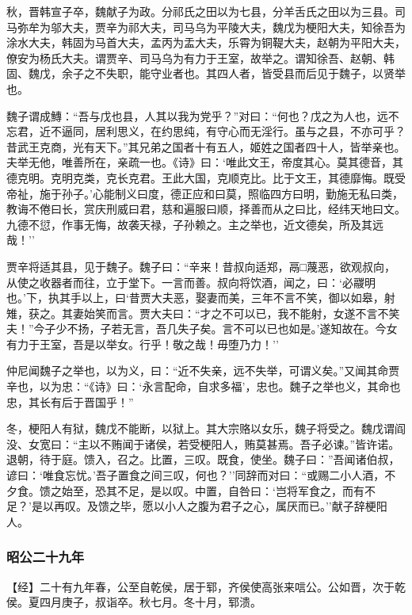 \documentclass[]{article}
\begin{document}
秋，晋韩宣子卒，魏献子为政。分祁氏之田以为七县，分羊舌氏之田以为三县。司马弥牟为邬大夫，贾辛为祁大夫，司马乌为平陵大夫，魏戊为梗阳大夫，知徐吾为涂水大夫，韩固为马首大夫，孟丙为盂大夫，乐霄为铜鞮大夫，赵朝为平阳大夫，僚安为杨氏大夫。谓贾辛、司马乌为有力于王室，故举之。谓知徐吾、赵朝、韩固、魏戊，余子之不失职，能守业者也。其四人者，皆受县而后见于魏子，以贤举也。

魏子谓成鱄：``吾与戊也县，人其以我为党乎？''对曰：``何也？戊之为人也，远不忘君，近不逼同，居利思义，在约思纯，有守心而无淫行。虽与之县，不亦可乎？昔武王克商，光有天下。''其兄弟之国者十有五人，姬姓之国者四十人，皆举亲也。夫举无他，唯善所在，亲疏一也。《诗》曰：`唯此文王，帝度其心。莫其德音，其德克明。克明克类，克长克君。王此大国，克顺克比。比于文王，其德靡悔。既受帝祉，施于孙子。'心能制义曰度，德正应和曰莫，照临四方曰明，勤施无私曰类，教诲不倦曰长，赏庆刑威曰君，慈和遍服曰顺，择善而从之曰比，经纬天地曰文。九德不愆，作事无悔，故袭天禄，子孙赖之。主之举也，近文德矣，所及其远哉！''

贾辛将适其县，见于魏子。魏子曰：``辛来！昔叔向适郑，鬲□蔑恶，欲观叔向，从使之收器者而往，立于堂下。一言而善。叔向将饮酒，闻之，曰：`必鬷明也。'下，执其手以上，曰`昔贾大夫恶，娶妻而美，三年不言不笑，御以如皋，射雉，获之。其妻始笑而言。贾大夫曰：``才之不可以已，我不能射，女遂不言不笑夫！''今子少不扬，子若无言，吾几失子矣。言不可以已也如是。'遂知故在。今女有力于王室，吾是以举女。行乎！敬之哉！毋堕乃力！''

仲尼闻魏子之举也，以为义，曰：``近不失亲，远不失举，可谓义矣。''又闻其命贾辛也，以为忠：``《诗》曰：`永言配命，自求多福'，忠也。魏子之举也义，其命也忠，其长有后于晋国乎！''

冬，梗阳人有狱，魏戊不能断，以狱上。其大宗赂以女乐，魏子将受之。魏戊谓阎没、女宽曰：``主以不贿闻于诸侯，若受梗阳人，贿莫甚焉。吾子必谏。''皆许诺。退朝，待于庭。馈入，召之。比置，三叹。既食，使坐。魏子曰：''吾闻诸伯叔，谚曰：`唯食忘忧。'吾子置食之间三叹，何也？''同辞而对曰：``或赐二小人酒，不夕食。馈之始至，恐其不足，是以叹。中置，自咎曰：`岂将军食之，而有不足？'是以再叹。及馈之毕，愿以小人之腹为君子之心，属厌而已。''献子辞梗阳人。

\hypertarget{header-n2831}{%
\subsubsection{昭公二十九年}\label{header-n2831}}

【经】二十有九年春，公至自乾侯，居于郓，齐侯使高张来唁公。公如晋，次于乾侯。夏四月庚子，叔诣卒。秋七月。冬十月，郓溃。
\end{document}
